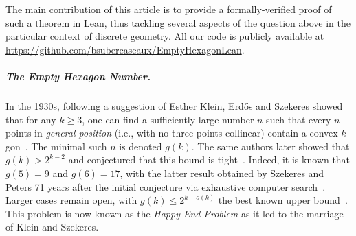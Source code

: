 % 

The main contribution of this article is to provide a formally-verified proof of such a theorem in Lean, thus tackling several aspects of the question above in the particular context of discrete geometry.
All our code is publicly available at \url{https://github.com/bsubercaseaux/EmptyHexagonLean}.

\subparagraph*{The Empty Hexagon Number.}
In the 1930s,
following a suggestion of Esther Klein,
Erd\H{o}s and Szekeres showed that for any $k \geq 3$,
one can find a sufficiently large number $n$
such that every $n$ points in \emph{general position}
(i.e., with no three points collinear)
contain a convex $k$-gon~\cite{35erdos_combinatorial_problem_geometry}.
The minimal such $n$ is denoted $g(k)$.
The same authors later showed that $g(k) > 2^{k-2}$
and conjectured that this bound is tight~\cite{60erdos_some_extremum_problems_elementary_geometry}.
Indeed, it is known that $g(5) = 9$ and $g(6) = 17$,
with the latter result obtained by Szekeres and Peters 71 years after the initial conjecture
via exhaustive computer search~\cite{06szekeres_computer_solution_17_point_erdos_szekeres_problem}.
Larger cases remain open,
with $g(k) \leq 2^{k+o(k)}$ the best known upper bound~\cite{suk2017erdos,holmsen2017two}.
This problem is now known as the \emph{Happy End Problem}
as it led to the marriage of Klein and Szekeres.

